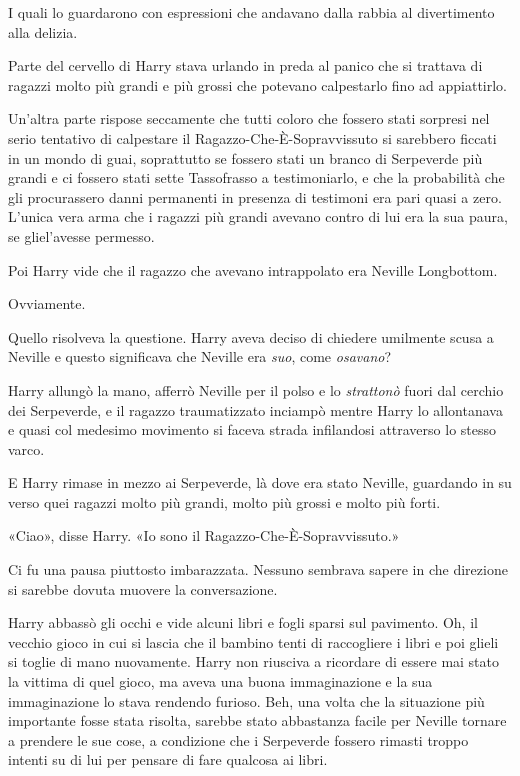 I quali lo guardarono con espressioni che andavano dalla rabbia al divertimento alla delizia.

Parte del cervello di Harry stava urlando in preda al panico che si trattava di ragazzi molto più grandi e più grossi che potevano calpestarlo fino ad appiattirlo.

Un’altra parte rispose seccamente che tutti coloro che fossero stati sorpresi nel serio tentativo di calpestare il Ragazzo-Che-È-Sopravvissuto si sarebbero ficcati in un mondo di guai, soprattutto se fossero stati un branco di Serpeverde più grandi e ci fossero stati sette Tassofrasso a testimoniarlo, e che la probabilità che gli procurassero danni permanenti in presenza di testimoni era pari quasi a zero. L’unica vera arma che i ragazzi più grandi avevano contro di lui era la sua paura, se gliel’avesse permesso.

Poi Harry vide che il ragazzo che avevano intrappolato era Neville Longbottom.

Ovviamente.

Quello risolveva la questione. Harry aveva deciso di chiedere umilmente scusa a Neville e questo significava che Neville era \textit{suo}, come \textit{osavano}?

Harry allungò la mano, afferrò Neville per il polso e lo \textit{strattonò} fuori dal cerchio dei Serpeverde, e il ragazzo traumatizzato inciampò mentre Harry lo allontanava e quasi col medesimo movimento si faceva strada infilandosi attraverso lo stesso varco.

E Harry rimase in mezzo ai Serpeverde, là dove era stato Neville, guardando in su verso quei ragazzi molto più grandi, molto più grossi e molto più forti.

«Ciao», disse Harry. «Io sono il Ragazzo-Che-È-Sopravvissuto.»

Ci fu una pausa piuttosto imbarazzata. Nessuno sembrava sapere in che direzione si sarebbe dovuta muovere la conversazione.

Harry abbassò gli occhi e vide alcuni libri e fogli sparsi sul pavimento. Oh, il vecchio gioco in cui si lascia che il bambino tenti di raccogliere i libri e poi glieli si toglie di mano nuovamente. Harry non riusciva a ricordare di essere mai stato la vittima di quel gioco, ma aveva una buona immaginazione e la sua immaginazione lo stava rendendo furioso. Beh, una volta che la situazione più importante fosse stata risolta, sarebbe stato abbastanza facile per Neville tornare a prendere le sue cose, a condizione che i Serpeverde fossero rimasti troppo intenti su di lui per pensare di fare qualcosa ai libri.

